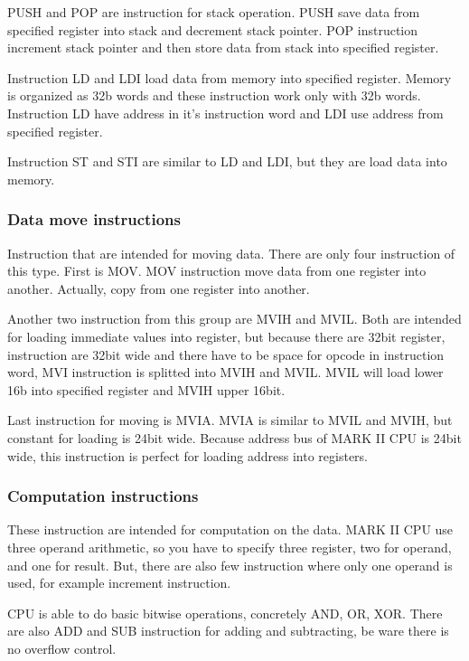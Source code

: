 PUSH and POP are instruction for stack operation. PUSH save data from specified
register into stack and decrement stack pointer. POP instruction increment
stack pointer and then store data from stack into specified register.

Instruction LD and LDI load data from memory into specified register. Memory is
organized as 32b words and these instruction work only with 32b words.
Instruction LD have address in it's instruction word and LDI use address from
specified register.

Instruction ST and STI are similar to LD and LDI, but they are load data into
memory.

\subsubsection{Data move instructions}

Instruction that are intended for moving data. There are only four instruction
of this type. First is MOV. MOV instruction move data from one register into
another. Actually, copy from one register into another.

Another two instruction from this group are MVIH and MVIL. Both are intended
for loading immediate values into register, but because there are 32bit
register, instruction are 32bit wide and there have to be space for opcode in
instruction word, MVI instruction is splitted into MVIH and MVIL. MVIL will
load lower 16b into specified register and MVIH upper 16bit.

Last instruction for moving is MVIA. MVIA is similar to MVIL and MVIH, but
constant for loading is 24bit wide. Because address bus of MARK II CPU is 24bit
wide, this instruction is perfect for loading address into registers.

\subsubsection{Computation instructions}

These instruction are intended for computation on the data. MARK II CPU use
three operand arithmetic, so you have to specify three register, two for
operand, and one for result. But, there are also few instruction where only one
operand is used, for example increment instruction.

CPU is able to do basic bitwise operations, concretely AND, OR, XOR. There are
also ADD and SUB instruction for adding and subtracting, be ware there is no
overflow control.

